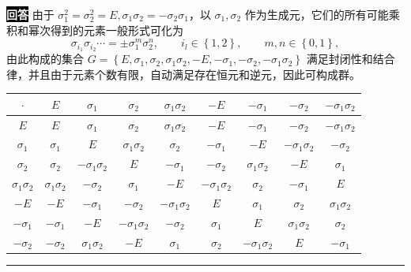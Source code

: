 \documentclass[11pt,a4paper]{ctexart}
\newenvironment{answer}
  {\par\smallskip\noindent
   \begingroup
   \setlength{\fboxsep}{4pt}%
   \colorbox{black}{\textcolor{white}{\bfseries 回答}}%
   \endgroup
   \quad\ignorespaces}
  {\par\smallskip\noindent\rule{\linewidth}{0.4pt}\medskip}
\begin{document}
\begin{answer}
  由于 $\sigma_1^2=\sigma_2^2=E,\sigma_1\sigma_2=-\sigma_2\sigma_1 $，以 $\sigma_1,\sigma_2 $ 作为生成元，它们的所有可能乘积和幂次得到的元素一般形式可化为
  \begin{equation}
    \sigma_{i_1}\sigma_{i_2}\cdots
    =\pm \sigma_1^{m} \sigma_2^{n},\qquad i_l\in \left\{ 1,2\right\},\qquad m,n\in \left\{0,1 \right\},
  \end{equation}
  由此构成的集合 $G=\left\{E,\sigma_1,\sigma_2,\sigma_1\sigma_2,-E,-\sigma_1,-\sigma_2,-\sigma_1\sigma_2 \right\} $ 满足封闭性和结合律，并且由于元素个数有限，自动满足存在恒元和逆元，因此可构成群。
  \begin{center}
  \renewcommand{\arraystretch}{1.25}
  \setlength{\tabcolsep}{5pt}
  \begin{tabular}{c|*{8}{c}}
    $\cdot$
    & $E$
    & $\sigma_1$
    & $\sigma_2$
    & $\sigma_1\sigma_2$
    & $-E$
    & $-\sigma_1$
    & $-\sigma_2$
    & $-\sigma_1\sigma_2$ \\ \hline

    $E$
    & $E$
    & $\sigma_1$
    & $\sigma_2$
    & $\sigma_1\sigma_2$
    & $-E$
    & $-\sigma_1$
    & $-\sigma_2$
    & $-\sigma_1\sigma_2$ \\

    $\sigma_1$
    & $\sigma_1$
    & $E$
    & $\sigma_1\sigma_2$
    & $\sigma_2$
    & $-\sigma_1$
    & $-E$
    & $-\sigma_1\sigma_2$
    & $-\sigma_2$ \\

    $\sigma_2$
    & $\sigma_2$
    & $-\sigma_1\sigma_2$
    & $E$
    & $-\sigma_1$
    & $-\sigma_2$
    & $\sigma_1\sigma_2$
    & $-E$
    & $\sigma_1$ \\

    $\sigma_1\sigma_2$
    & $\sigma_1\sigma_2$
    & $-\sigma_2$
    & $\sigma_1$
    & $-E$
    & $-\sigma_1\sigma_2$
    & $\sigma_2$
    & $-\sigma_1$
    & $E$ \\

    $-E$
    & $-E$
    & $-\sigma_1$
    & $-\sigma_2$
    & $-\sigma_1\sigma_2$
    & $E$
    & $\sigma_1$
    & $\sigma_2$
    & $\sigma_1\sigma_2$ \\

    $-\sigma_1$
    & $-\sigma_1$
    & $-E$
    & $-\sigma_1\sigma_2$
    & $-\sigma_2$
    & $\sigma_1$
    & $E$
    & $\sigma_1\sigma_2$
    & $\sigma_2$ \\

    $-\sigma_2$
    & $-\sigma_2$
    & $\sigma_1\sigma_2$
    & $-E$
    & $\sigma_1$
    & $\sigma_2$
    & $-\sigma_1\sigma_2$
    & $E$
    & $-\sigma_1$ \\


\end{tabular}
\end{center}
\end{answer}
\end{document}

